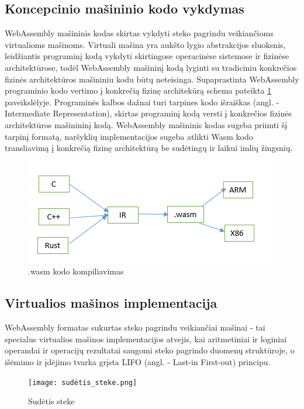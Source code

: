 \documentclass{VUMIFPSkursinis}
\begin{document}
\subsection{Koncepcinio mašininio kodo vykdymas}
WebAssembly mašininis kodas skirtas vykdyti steko pagrindu veikiančioms virtualioms mašinoms. Virtuali mašina yra aukšto lygio abstrakcijos sluoksnis, leidžiantis programinį kodą vykdyti skirtingose operacinėse sistemose ir fizinėse architektūrose, todėl WebAssembly mašininį kodą lyginti su tradiciniu konkrečios fizinės architektūros mašininiu kodu būtų neteisinga. Supaprastinta WebAssembly programinio kodo vertimo į konkrečią fizinę architekūrą schema pateikta \ref{fig:wasm_compilation} paveikslėlyje. Programinės kalbos dažnai turi tarpines kodo išraiškas (angl. - Intermediate Representation), skirtas programinį kodą versti į konkrečios fizinės architektūros mašinininį kodą. WebAssembly mašininis kodas sugeba priimti šį tarpinį formatą, naršyklių implementacijos sugeba atlikti Wasm kodo transliavimą į konkrečią fizinę architektūrą be sudėtingų ir laikui imlių žingsnių. 

\begin{figure}[h!]
  \begin{center}
  \includegraphics[scale=0.8]{webassembly_kompiliavimas.png}
  \end{center}
  \caption{.wasm kodo kompiliavimas}
  \label{fig:wasm_compilation}
\end{figure}

\subsection{Virtualios mašinos implementacija}

WebAssembly formatas sukurtas steko pagrindu veikiančiai mašinai - tai specialus virtualios mašinos implementacijos atvejis, kai aritmetiniai ir loginiai operandai ir operacijų rezultatai saugomi steko pagrindo duomenų struktūroje, o išėmimo ir įdėjimo tvarka grįsta LIFO (angl. - Last-in First-out) principu. 

\begin{figure}[h!]
  \begin{center}
  \texttt{[image: sudėtis\_steke.png]}
  \end{center}
  \caption{Sudėtis steke}
  \label{fig:stack_addition}
\end{figure}
\end{document}
